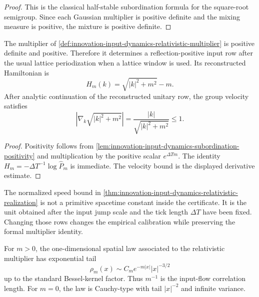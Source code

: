 \begin{proof}
This is the classical half-stable subordination formula for the square-root
semigroup. Since each Gaussian multiplier is positive definite and the
mixing measure is positive, the mixture is positive definite.
\end{proof}

\begin{theorem}
\label{thm:innovation-input-dynamics-relativistic-realization}
The multiplier of
\autoref{def:innovation-input-dynamics-relativistic-multiplier} is
positive definite and positive. Therefore it determines a
reflection-positive input row after the usual lattice periodization when a
lattice window is used. Its reconstructed Hamiltonian is
$$
H_m(k)=\sqrt{|k|^2+m^2}-m.
$$
After analytic continuation of the reconstructed unitary row, the group
velocity satisfies
$$
\left|\nabla_k\sqrt{|k|^2+m^2}\right|
=
\frac{|k|}{\sqrt{|k|^2+m^2}}
\le1.
$$
\end{theorem}

\begin{proof}
Positivity follows from \autoref{lem:innovation-input-dynamics-subordination-positivity}
and multiplication by the positive scalar $e^{\Delta Tm}$. The identity
$H_m=-\Delta T^{-1}\log\widehat P_m$ is immediate. The velocity bound is
the displayed derivative estimate.
\end{proof}

\begin{principle}
\label{prin:innovation-input-dynamics-speed-scale-read}
The normalized speed bound in
\autoref{thm:innovation-input-dynamics-relativistic-realization} is not a
primitive spacetime constant inside the certificate. It is the unit obtained
after the input jump scale and the tick length $\Delta T$ have been fixed.
Changing those rows changes the empirical calibration while preserving the
formal multiplier identity.
\end{principle}

\begin{theorem}
\label{thm:innovation-input-dynamics-mass-correlation-length}
For $m>0$, the one-dimensional spatial law associated to the relativistic
multiplier has exponential tail
$$
\rho_m(x)\sim C_m e^{-m|x|}|x|^{-3/2}
$$
up to the standard Bessel-kernel factor. Thus $m^{-1}$ is the input-flow
correlation length. For $m=0$, the law is Cauchy-type with tail
$|x|^{-2}$ and infinite variance.
\end{theorem}

